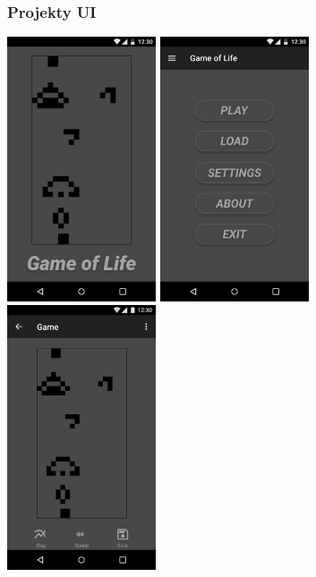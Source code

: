\documentclass[12pt,a4paper]{article}
\begin{document}
\subsubsection{Projekty UI}
\includegraphics[width=0.33\textwidth]{Images/ui_splash.png}
\includegraphics[width=0.33\textwidth]{Images/ui_main.png}
\includegraphics[width=0.33\textwidth]{Images/ui_game.png}
\end{document}
